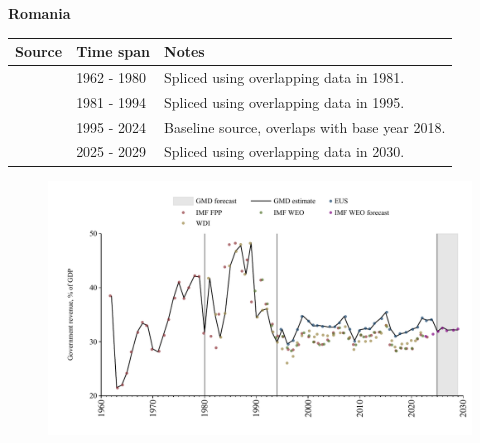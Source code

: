 \documentclass[12pt,a4paper,landscape]{article}
\begin{document}
\begin{adjustbox}{max totalsize={\paperwidth}{\paperheight},center}
\begin{minipage}[t][\textheight][t]{\textwidth}
\vspace*{0.5cm}
{}
\begin{center}
{\Large\bfseries Romania}
\end{center}
\vspace{0.5cm}
\begin{table}[H]
\centering
\small
\begin{tabular}{|l|l|l|}
\hline
\textbf{Source} & \textbf{Time span} & \textbf{Notes} \\
\hline
\rowcolor{white}\cite{IMF_FPP}& 1962 - 1980 &Spliced using overlapping data in 1981.\\
\rowcolor{lightgray}\cite{WDI}& 1981 - 1994 &Spliced using overlapping data in 1995.\\
\rowcolor{white}\cite{EUS}& 1995 - 2024 &Baseline source, overlaps with base year 2018.\\
\rowcolor{lightgray}\cite{IMF_WEO_forecast}& 2025 - 2029 &Spliced using overlapping data in 2030.\\
\hline
\end{tabular}
\end{table}
\begin{figure}[H]
\centering
\includegraphics[width=\textwidth,height=0.6\textheight,keepaspectratio]{graphs/ROU_govrev_GDP.pdf}
\end{figure}
\end{minipage}
\end{adjustbox}
\end{document}
